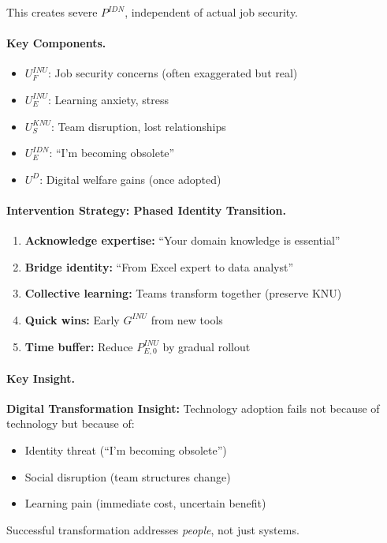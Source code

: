 This creates severe $P^{IDN}$, independent of actual job security.

\paragraph{Key Components.}
\begin{itemize}
\item $U^{INU}_{F}$: Job security concerns (often exaggerated but real)
\item $U^{INU}_{E}$: Learning anxiety, stress
\item $U^{KNU}_{S}$: Team disruption, lost relationships
\item $U^{IDN}_{E}$: ``I'm becoming obsolete''
\item $U^D$: Digital welfare gains (once adopted)
\end{itemize}

\paragraph{Intervention Strategy: Phased Identity Transition.}
\begin{enumerate}
\item \textbf{Acknowledge expertise:} ``Your domain knowledge is essential''
\item \textbf{Bridge identity:} ``From Excel expert to data analyst''
\item \textbf{Collective learning:} Teams transform together (preserve KNU)
\item \textbf{Quick wins:} Early $G^{INU}$ from new tools
\item \textbf{Time buffer:} Reduce $P^{INU}_{E,0}$ by gradual rollout
\end{enumerate}

\paragraph{Key Insight.}
\begin{tcolorbox}[colback=yellow!10!white, colframe=yellow!50!black]
\textbf{Digital Transformation Insight:}
Technology adoption fails not because of technology but because of:
\begin{itemize}
\item Identity threat (``I'm becoming obsolete'')
\item Social disruption (team structures change)
\item Learning pain (immediate cost, uncertain benefit)
\end{itemize}
Successful transformation addresses \emph{people}, not just systems.
\end{tcolorbox}

